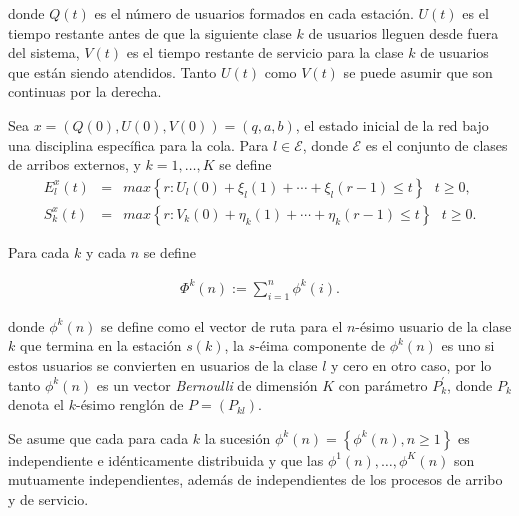 \documentclass{article}
\numberwithin{equation}{section}
\begin{document}
donde $Q\left(t\right)$ es el n\'umero de usuarios formados en
cada estaci\'on. $U\left(t\right)$ es el tiempo restante antes de
que la siguiente clase $k$ de usuarios lleguen desde fuera del
sistema, $V\left(t\right)$ es el tiempo restante de servicio para
la clase $k$ de usuarios que est\'an siendo atendidos. Tanto
$U\left(t\right)$ como $V\left(t\right)$ se puede asumir que son
continuas por la derecha.

Sea
$x=\left(Q\left(0\right),U\left(0\right),V\left(0\right)\right)=\left(q,a,b\right)$,
el estado inicial de la red bajo una disciplina espec\'ifica para
la cola. Para $l\in\mathcal{E}$, donde $\mathcal{E}$ es el conjunto de clases de arribos externos, y $k=1,\ldots,K$ se define\\
\begin{eqnarray*}
E_{l}^{x}\left(t\right)&=&max\left\{r:U_{l}\left(0\right)+\xi_{l}\left(1\right)+\cdots+\xi_{l}\left(r-1\right)\leq
t\right\}\textrm{   }t\geq0,\\
S_{k}^{x}\left(t\right)&=&max\left\{r:V_{k}\left(0\right)+\eta_{k}\left(1\right)+\cdots+\eta_{k}\left(r-1\right)\leq
t\right\}\textrm{   }t\geq0.
\end{eqnarray*}

Para cada $k$ y cada $n$ se define

\begin{eqnarray*}\label{Eq.phi}
\Phi^{k}\left(n\right):=\sum_{i=1}^{n}\phi^{k}\left(i\right).
\end{eqnarray*}

donde $\phi^{k}\left(n\right)$ se define como el vector de ruta
para el $n$-\'esimo usuario de la clase $k$ que termina en la
estaci\'on $s\left(k\right)$, la $s$-\'eima componente de
$\phi^{k}\left(n\right)$ es uno si estos usuarios se convierten en
usuarios de la clase $l$ y cero en otro caso, por lo tanto
$\phi^{k}\left(n\right)$ es un vector {\em Bernoulli} de
dimensi\'on $K$ con par\'ametro $P_{k}^{'}$, donde $P_{k}$ denota
el $k$-\'esimo rengl\'on de $P=\left(P_{kl}\right)$.

Se asume que cada para cada $k$ la sucesi\'on $\phi^{k}\left(n\right)=\left\{\phi^{k}\left(n\right),n\geq1\right\}$
es independiente e id\'enticamente distribuida y que las
$\phi^{1}\left(n\right),\ldots,\phi^{K}\left(n\right)$ son
mutuamente independientes, adem\'as de independientes de los
procesos de arribo y de servicio.\\
\end{document}

